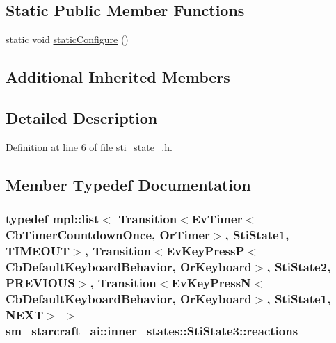 \subsection*{Static Public Member Functions}
\begin{DoxyCompactItemize}
\item 
static void \hyperlink{structsm__starcraft__ai_1_1inner__states_1_1StiState3_ae4e2e3711e0965f6a2e748a7eee148b5}{static\+Configure} ()
\end{DoxyCompactItemize}
\subsection*{Additional Inherited Members}


\subsection{Detailed Description}


Definition at line 6 of file sti\+\_\+state\+\_.\+h.



\subsection{Member Typedef Documentation}
\subsubsection[{\texorpdfstring{reactions}{reactions}}]{\setlength{\rightskip}{0pt plus 5cm}typedef mpl\+::list$<$ Transition$<$Ev\+Timer$<$Cb\+Timer\+Countdown\+Once, {\bf Or\+Timer}$>$, {\bf Sti\+State1}, {\bf T\+I\+M\+E\+O\+UT}$>$, Transition$<$Ev\+Key\+PressP$<$Cb\+Default\+Keyboard\+Behavior, {\bf Or\+Keyboard}$>$, {\bf Sti\+State2}, {\bf P\+R\+E\+V\+I\+O\+US}$>$, Transition$<$Ev\+Key\+PressN$<$Cb\+Default\+Keyboard\+Behavior, {\bf Or\+Keyboard}$>$, {\bf Sti\+State1}, {\bf N\+E\+XT}$>$ $>$ {\bf sm\+\_\+starcraft\+\_\+ai\+::inner\+\_\+states\+::\+Sti\+State3\+::reactions}}\hypertarget{structsm__starcraft__ai_1_1inner__states_1_1StiState3_ab7315c1c1992df9383a2fa551891d76a}{}\label{structsm__starcraft__ai_1_1inner__states_1_1StiState3_ab7315c1c1992df9383a2fa551891d76a}


